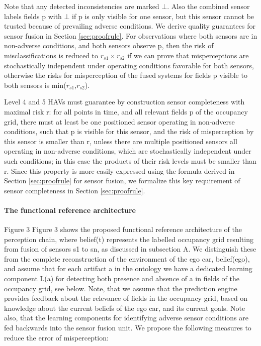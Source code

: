 Note that any detected inconsistencies are marked $\bot$. Also the combined sensor labels fields p with $\bot$ if p is only visible for one sensor, but this sensor cannot be trusted because of prevailing adverse conditions. We derive quality guarantees for sensor fusion in Section \ref{sec:proofrule}. For observations where both sensors are in non-adverse conditions, and both sensors observe p, then the risk of misclassifications is reduced to $r_{s1} \times r_{s2}$ if we can prove that misperceptions are stochastically independent under operating conditions favorable for both sensors, otherwise the risks for misperception of the fused systems for fields p visible to both sensors is min($r_{s1}$,$r_{s2}$).

Level 4 and 5 HAVs must guarantee by construction sensor completeness with maximal risk r: for all points in time, and all relevant fields p of the occupancy grid, there must at least be one positioned sensor operating in non-adverse conditions, such that p is visible for this sensor, and the risk of misperception by this sensor is smaller than r, unless there are multiple positioned sensors all operating in non-adverse conditions, which are stochastically independent under such conditions; in this case the products of their risk levels must be smaller than r. Since this property is more easily expressed using the formula derived in Section \ref{sec:proofrule} for sensor fusion, we formalize this key requirement of sensor completeness in Section \ref{sec:proofrule}.

\paragraph{The functional reference architecture}


Figure 3
Figure 3 shows the proposed functional reference architecture of the perception chain, where belief(t) represents the labelled occupancy grid resulting from fusion of sensors s1 to sn, as discussed in subsection A. We distinguish these from the complete reconstruction of the environment of the ego car, belief(ego), and assume that for each artifact  a in the ontology we have a dedicated learning component  L(a) for detecting both presence and absence of a in fields of the occupancy grid, see below. Note, that we assume that the prediction engine provides feedback about the relevance of fields in the occupancy grid, based on knowledge about the current beliefs of the ego car, and its current goals. Note also, that the learning components for identifying adverse sensor conditions are fed backwards into the sensor fusion unit. We propose the following measures to reduce the error of misperception:

